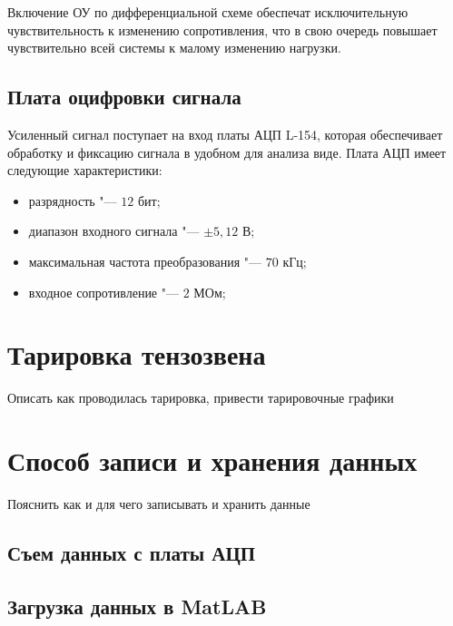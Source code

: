 Включение ОУ по дифференциальной схеме обеспечат исключительную чувствительность к изменению сопротивления, что в свою очередь повышает чувствительно всей системы к малому изменению нагрузки.


\subsection{Плата оцифровки сигнала}\label{subsect2_4_3}

Усиленный сигнал поступает на вход платы АЦП L-154, которая обеспечивает обработку и фиксацию сигнала в удобном для анализа виде. Плата АЦП имеет следующие характеристики:
\begin{itemize}
	\item разрядность "--- $12$ бит;
	\item диапазон входного сигнала "--- $\pm5,12$ В;
	\item максимальная частота преобразования "--- $70$ кГц;
	\item входное сопротивление "--- $2$ МОм;
\end{itemize}


\section{Тарировка тензозвена}\label{sect2_5}

Описать как проводилась тарировка, привести тарировочные графики

\section{Способ записи и хранения данных}\label{sect2_6}

Пояснить как и для чего записывать и хранить данные

\subsection{Съем данных с платы АЦП}\label{subsect2_6_1}

\subsection{Загрузка данных в MatLAB}\label{subsect2_6_2}

